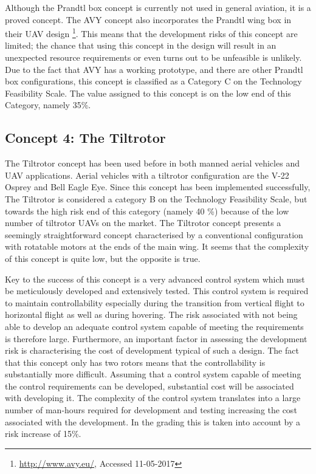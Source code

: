 Although the Prandtl box concept is currently not used in general aviation, it is a proved concept. The AVY concept also incorporates the Prandtl wing box in their UAV design \footnote{\url{http://www.avy.eu/}, Accessed 11-05-2017}. This means that the development risks of this concept are limited; the chance that using this concept in the design will result in an unexpected resource requirements or even turns out to be unfeasible is unlikely. Due to the fact that AVY has a working prototype, and there are other Prandtl box configurations, this concept is classified as a Category C on the Technology Feasibility Scale. The value assigned to this concept is on the low end of this Category, namely 35\%.

\subsection{Concept 4: The Tiltrotor}
The Tiltrotor concept has been used before in both manned aerial vehicles and UAV applications. Aerial vehicles with a tiltrotor configuration are the V-22 Osprey and Bell Eagle Eye. Since this concept has been implemented successfully, The Tiltrotor is considered a category B on the Technology Feasibility Scale, but towards the high risk end of this category (namely 40 \%) because of the low number of tiltrotor UAVs on the market.                                   
The Tiltrotor concept presents a seemingly straightforward concept characterised by a conventional configuration with rotatable motors at the ends of the main wing. It seems that the complexity of this concept is quite low, but the opposite is true. 

Key to the success of this concept is a very advanced control system which must be meticulously developed and extensively tested. This control system is required to maintain controllability especially during the transition from vertical flight to horizontal flight as well as during hovering. The risk associated with not being able to develop an adequate control system capable of meeting the requirements is therefore large. Furthermore, an important factor in assessing the development risk is characterising the cost of development typical of such a design. The fact that this concept only has two rotors means that the controllability is substantially more difficult. Assuming that a control system capable of meeting the control requirements can be developed, substantial cost will be associated with developing it. The complexity of the control system translates into a large number of man-hours required for development and testing increasing the cost associated with the development. In the grading this is taken into account by a risk increase of 15\%.


